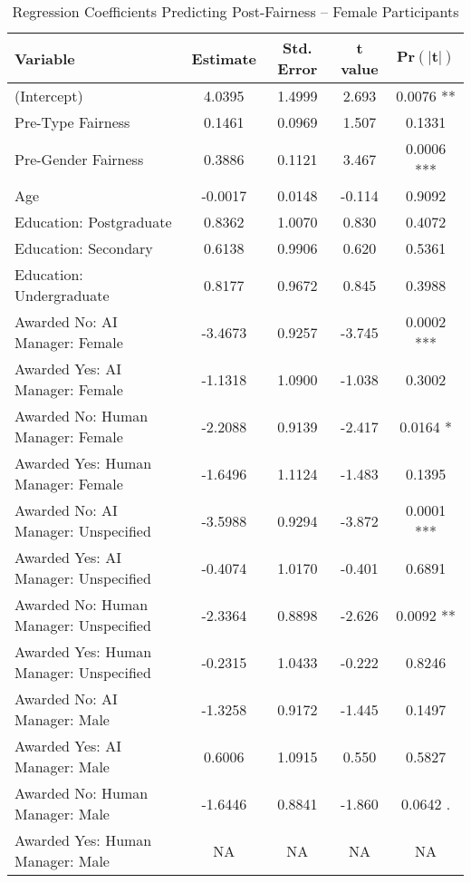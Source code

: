 \begin{table}[ht]
    \centering
    \caption{Regression Coefficients Predicting Post-Fairness -- Female Participants}
    \begin{tabular}{lcccc}
        \toprule
        \textbf{Variable} & \textbf{Estimate} & \textbf{Std. Error} & \textbf{t value} & 
        $\mathbf{\text{Pr}(|t|)}$
        \\
        \midrule
        (Intercept) & 4.0395  & 1.4999  & 2.693  & 0.0076 **  \\
        Pre-Type Fairness & 0.1461  & 0.0969  & 1.507  & 0.1331  \\
        Pre-Gender Fairness & 0.3886  & 0.1121  & 3.467  & 0.0006 ***  \\
        Age & -0.0017  & 0.0148  & -0.114  & 0.9092  \\
        Education: Postgraduate & 0.8362  & 1.0070  & 0.830  & 0.4072  \\
        Education: Secondary & 0.6138  & 0.9906  & 0.620  & 0.5361  \\
        Education: Undergraduate & 0.8177  & 0.9672  & 0.845  & 0.3988  \\
        Awarded No: AI Manager: Female & -3.4673  & 0.9257  & -3.745  & 0.0002 ***  \\
        Awarded Yes: AI Manager: Female & -1.1318  & 1.0900  & -1.038  & 0.3002  \\
        Awarded No: Human Manager: Female & -2.2088  & 0.9139  & -2.417  & 0.0164 *  \\
        Awarded Yes: Human Manager: Female & -1.6496  & 1.1124  & -1.483  & 0.1395  \\
        Awarded No: AI Manager: Unspecified & -3.5988  & 0.9294  & -3.872  & 0.0001 ***  \\
        Awarded Yes: AI Manager: Unspecified & -0.4074  & 1.0170  & -0.401  & 0.6891  \\
        Awarded No: Human Manager: Unspecified & -2.3364  & 0.8898  & -2.626  & 0.0092 **  \\
        Awarded Yes: Human Manager: Unspecified & -0.2315  & 1.0433  & -0.222  & 0.8246  \\
        Awarded No: AI Manager: Male & -1.3258  & 0.9172  & -1.445  & 0.1497  \\
        Awarded Yes: AI Manager: Male & 0.6006  & 1.0915  & 0.550  & 0.5827  \\
        Awarded No: Human Manager: Male & -1.6446  & 0.8841  & -1.860  & 0.0642 .  \\
        Awarded Yes: Human Manager: Male & NA  & NA  & NA  & NA  \\

\end{tabular}
\end{table}
